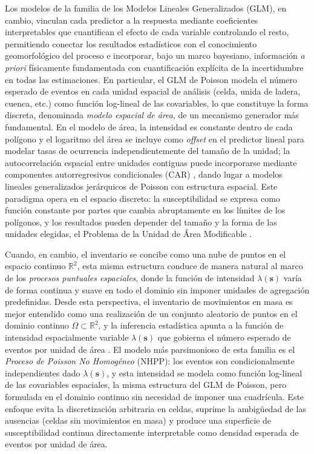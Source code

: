 \documentclass[12pt, a4paper]{article}
\begin{document}
Los modelos 
de la familia de los Modelos Lineales Generalizados (GLM), en cambio, vinculan 
cada predictor a la respuesta mediante coeficientes interpretables que cuantifican 
el efecto de cada variable controlando el resto, permitiendo conectar los resultados
 estadísticos con el conocimiento geomorfológico del proceso e incorporar, bajo un
  marco bayesiano, información \emph{a priori} físicamente fundamentada con 
  cuantificación explícita de la incertidumbre en todas las estimaciones. En 
  particular, el GLM de Poisson modela el
  número esperado de eventos en cada unidad espacial de análisis (celda, unida de ladera, cuenca, etc.) como función log-lineal
  de las covariables, lo que constituye la forma discreta, denominada
  \emph{modelo espacial de área}, de un mecanismo
  generador más fundamental. En el modelo de área, la intensidad es constante
  dentro de cada polígono y el logaritmo del área se incluye como \emph{offset}
  en el predictor lineal para modelar tasas de ocurrencia independientemente
  del tamaño de la unidad; la autocorrelación espacial entre unidades contiguas
  puede incorporarse mediante componentes autorregresivos condicionales (CAR)
  \citep{besag1974, besag1991},
  dando lugar a modelos lineales generalizados jerárquicos de Poisson con
  estructura espacial. Este paradigma opera en el espacio discreto: la
  susceptibilidad se expresa como función constante por partes que cambia
  abruptamente en los límites de los polígonos, y los resultados pueden depender
  del tamaño y la forma de las unidades elegidas, el Problema de la Unidad de
  Área Modificable \citep[MAUP;][]{openshaw1984, fotheringham1991}.
  
  Cuando, en cambio, el inventario se concibe como
  una nube de puntos en el espacio continuo $\mathbb{R}^2$, esta misma estructura
  conduce de manera natural al marco de los \emph{procesos puntuales espaciales},
  donde la función de intensidad $\lambda(\mathbf{s})$ varía de forma continua
  y suave en todo el dominio sin imponer unidades de agregación predefinidas. 
  Desde esta perspectiva, el inventario de movimientos en masa es mejor
entendido como una realización de un conjunto aleatorio de puntos en el
dominio continuo $\Omega \subset \mathbb{R}^2$, y la inferencia estadística
apunta a la función de intensidad espacialmente variable $\lambda(\mathbf{s})$
que gobierna el número esperado de eventos por unidad de área
\citep{diggle2013}. El modelo más parsimonioso de esta familia es el
\emph{Proceso de Poisson No Homogéneo} (NHPP): los eventos son
condicionalmente independientes dado $\lambda(\mathbf{s})$, y esta intensidad
se modela como función log-lineal de las covariables espaciales, la misma
estructura del GLM de Poisson, pero formulada en el dominio continuo sin
necesidad de imponer una cuadrícula. Este enfoque evita la discretización
arbitraria en celdas, suprime la ambigüedad de las ausencias (celdas sin movimientos en masa) y
produce una superficie de susceptibilidad continua directamente interpretable
como densidad esperada de eventos por unidad de área.
\end{document}
